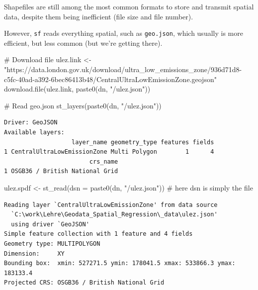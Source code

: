 \documentclass[
  letterpaper,
]{scrbook}
\newenvironment{Shaded}{\begin{snugshade}}{\end{snugshade}}
\newcommand{\AttributeTok}[1]{\textcolor[rgb]{0.40,0.45,0.13}{#1}}
\newcommand{\CommentTok}[1]{\textcolor[rgb]{0.37,0.37,0.37}{#1}}
\newcommand{\FunctionTok}[1]{\textcolor[rgb]{0.28,0.35,0.67}{#1}}
\newcommand{\NormalTok}[1]{\textcolor[rgb]{0.00,0.23,0.31}{#1}}
\newcommand{\OtherTok}[1]{\textcolor[rgb]{0.00,0.23,0.31}{#1}}
\newcommand{\StringTok}[1]{\textcolor[rgb]{0.13,0.47,0.30}{#1}}
\begin{document}
Shapefiles are still among the most common formats to store and transmit
spatial data, despite them being inefficient (file size and file
number).

However, \texttt{sf} reads everything spatial, such as
\texttt{geo.json}, which usually is more efficient, but less common (but
we're getting there).

\begin{Shaded}
\begin{Highlighting}[]
\CommentTok{\# Download file}
\NormalTok{ulez.link }\OtherTok{\textless{}{-}} \StringTok{"https://data.london.gov.uk/download/ultra\_low\_emissions\_zone/936d71d8{-}c5fc{-}40ad{-}a392{-}6bec86413b48/CentralUltraLowEmissionZone.geojson"}
\FunctionTok{download.file}\NormalTok{(ulez.link, }\FunctionTok{paste0}\NormalTok{(dn, }\StringTok{"/ulez.json"}\NormalTok{))}
\end{Highlighting}
\end{Shaded}

\begin{Shaded}
\begin{Highlighting}[]
\CommentTok{\# Read geo.json}
\FunctionTok{st\_layers}\NormalTok{(}\FunctionTok{paste0}\NormalTok{(dn, }\StringTok{"/ulez.json"}\NormalTok{))}
\end{Highlighting}
\end{Shaded}

\begin{verbatim}
Driver: GeoJSON 
Available layers:
                   layer_name geometry_type features fields
1 CentralUltraLowEmissionZone Multi Polygon        1      4
                        crs_name
1 OSGB36 / British National Grid
\end{verbatim}

\begin{Shaded}
\begin{Highlighting}[]
\NormalTok{ulez.spdf }\OtherTok{\textless{}{-}} \FunctionTok{st\_read}\NormalTok{(}\AttributeTok{dsn =} \FunctionTok{paste0}\NormalTok{(dn, }\StringTok{"/ulez.json"}\NormalTok{)) }\CommentTok{\# here dsn is simply the file}
\end{Highlighting}
\end{Shaded}

\begin{verbatim}
Reading layer `CentralUltraLowEmissionZone' from data source 
  `C:\work\Lehre\Geodata_Spatial_Regression\_data\ulez.json' 
  using driver `GeoJSON'
Simple feature collection with 1 feature and 4 fields
Geometry type: MULTIPOLYGON
Dimension:     XY
Bounding box:  xmin: 527271.5 ymin: 178041.5 xmax: 533866.3 ymax: 183133.4
Projected CRS: OSGB36 / British National Grid
\end{verbatim}
\end{document}
